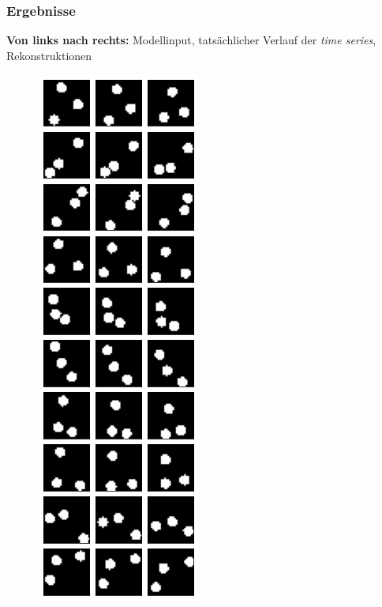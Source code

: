\begin{frame}
\begin{figure}[h!]
\begin{minipage}{0.33\textwidth}
	\end{minipage}
\end{figure}
\end{frame}




\begin{frame}
\frametitle{Ergebnisse}
\textbf{Von links nach rechts:} Modellinput, tatsächlicher Verlauf der \emph{time series}, Rekonstruktionen 
\begin{figure}[h!]
	\begin{minipage}{0.135\textwidth}
		\center{}
		\includegraphics[scale=0.19]{Bilder/bouncingBalls_ODEorig1}

\end{minipage}
\end{figure}
\end{frame}
